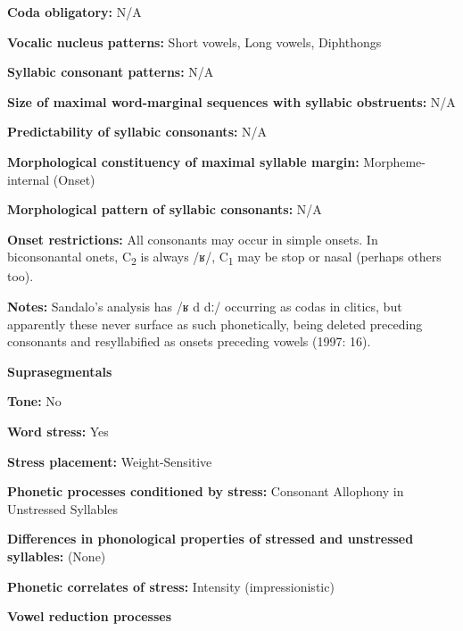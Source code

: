 \textbf{Coda obligatory:} N/A



\textbf{Vocalic nucleus patterns:} Short vowels, Long vowels, Diphthongs



\textbf{Syllabic consonant patterns:} N/A



\textbf{Size of maximal word{}-marginal sequences with syllabic obstruents:} N/A



\textbf{Predictability of syllabic consonants:} N/A



\textbf{Morphological constituency of maximal syllable margin:} Morpheme-internal (Onset)



\textbf{Morphological pattern of syllabic consonants:} N/A



\textbf{Onset restrictions:} All consonants may occur in simple onsets. In biconsonantal onets, C\textsubscript{2} is always /ʁ/, C\textsubscript{1} may be stop or nasal (perhaps others too).



\textbf{Notes:} Sandalo’s analysis has /ʁ d dː/ occurring as codas in clitics, but apparently these never surface as such phonetically, being deleted preceding consonants and resyllabified as onsets preceding vowels (1997: 16).



\textbf{Suprasegmentals}



\textbf{Tone:} No



\textbf{Word stress:} Yes



\textbf{Stress placement:} Weight-Sensitive



\textbf{Phonetic processes conditioned by stress:} Consonant Allophony in Unstressed Syllables



\textbf{Differences in phonological properties of stressed and unstressed syllables:} (None)



\textbf{Phonetic correlates of stress:} Intensity (impressionistic)



\textbf{Vowel reduction processes}




